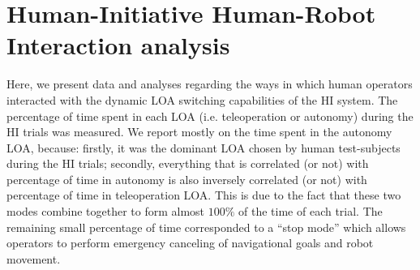 \documentclass[a4paper,12pt,oneside,openright]{bhamthesis}
\begin{document}
\section{Human-Initiative Human-Robot Interaction analysis}
Here, we present data and analyses regarding the ways in which human operators interacted with the dynamic LOA switching capabilities of the HI system. The percentage of time spent in each LOA (i.e. teleoperation or autonomy) during the HI trials was measured. We report mostly on the time spent in the autonomy LOA, because: firstly, it was the dominant LOA chosen by human test-subjects during the HI trials; secondly, everything that is correlated (or not) with percentage of time in autonomy is also inversely correlated (or not) with percentage of time in teleoperation LOA. This is due to the fact that these two modes combine together to form almost $100\%$ of the time of each trial. The remaining small percentage of time corresponded to a ``stop mode'' which allows operators to perform emergency canceling of navigational goals and robot movement. 
\end{document}
